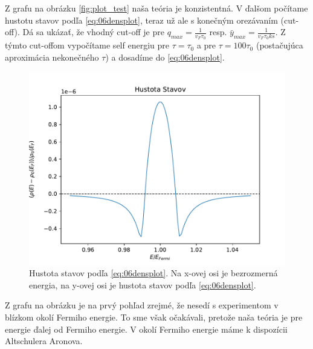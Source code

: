 Z grafu na obrázku \ref{fig:plot_test} naša teória je konzistentná. V ďalšom počítame hustotu stavov podľa \eqref{eq:06densplot}, teraz už ale s konečným orezávaním (cut-off). Dá sa ukázať, že vhodný cut-off je
pre $q_{max}=\frac{1}{v_F \tau_0}$ resp. $\bar{y}_{max}=\frac{1}{v_F \tau_0 ks}$. Z týmto cut-offom vypočítame self energiu pre $\tau=\tau_0$ a pre $\tau=100\tau_0$ (postačujúca aproximácia nekonečného $\tau$) a dosadíme do \eqref{eq:06densplot}. 

\begin{figure}[H]
\centering
\includegraphics[scale=1]{grafy/plot_dos}
\caption{Hustota stavov podľa \eqref{eq:06densplot}. Na x-ovej osi je bezrozmerná energia, na y-ovej osi je hustota stavov podľa \eqref{eq:06densplot}.}
\end{figure}
Z grafu na obrázku je na prvý pohľad zrejmé, že nesedí s experimentom v blízkom okolí Fermiho energie. To sme však očakávali, pretože naša teória je pre energie ďalej od Fermiho energie. V okolí Fermiho energie máme k dispozícii Altschulera Aronova. 

